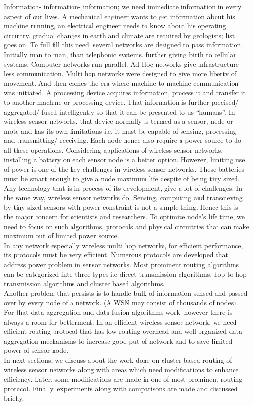 \documentclass[10pt, conference, compsocconf]{IEEEtran}
\begin{document}
Information- information- information; we need immediate information in every aspect of our lives. A mechanical engineer wants to get information about his machine running, an electrical engineer needs to know about his operating circuitry, gradual changes in earth and climate are required by geologists; list goes on. To full fill this need, several networks are designed to pass information. Initially man to man, than telephonic systems, further giving birth to cellular systems. Computer networks run parallel. Ad-Hoc networks give infrastructure-less communication. Multi hop networks were designed to give more liberty of movement. And then comes the era where machine to machine communication was initiated. A processing device acquires information, process it and transfer it to another machine or processing device. That information is further precised/ aggregated/ fused intelligently so that it can be presented to us ``humans''. In wireless sensor networks, that device normally is termed as a sensor, node or mote and has its own limitations i.e. it must be capable of sensing, processing and transmitting/ receiving. Each node hence also require a power source to do all these operations. Considering applications of wireless sensor networks, installing a battery on each sensor node is a better option. However, limiting use of power is one of the key challenges in wireless sensor networks. These batteries must be smart enough to give a node maximum life despite of being tiny sized. \\
Any technology that is in process of its development, give a lot of challenges. In the same way, wireless sensor networks do. Sensing, computing and transcieving by tiny sized sensors with power constraint is not a simple thing. Hence this is the major concern for scientists and researchers. To optimize node's life time, we need to focus on such algorithms, protocols and physical circuitries that can make maximum out of limited power source.\\
In any network especially wireless multi hop networks, for efficient performance, its protocols must be very efficient. Numerous protocols are developed that address power problem in sensor networks. Most prominent routing algorithms can be categorized into three types i.e direct transmission algorithms, hop to hop transmission algorithms and cluster based algorithms.\\
Another problem that persists is to handle bulk of information sensed and passed over by every node of a network. (A WSN may consist of thousands of nodes). For that data aggregation and data fusion algorithms work, however there is always a room for betterment. In an efficient wireless sensor network, we need efficient routing protocol that has low routing overhead and well organized data aggregation mechanisms to increase good put of network and to save limited power of sensor node. \\
In next sections, we discuss about the work done on cluster based routing of wireless sensor networks along with areas which need modifications to enhance efficiency. Later, some modifications are made in one of most prominent routing protocol. Finally, experiments along with comparisons are made and discussed briefly.
\end{document}

